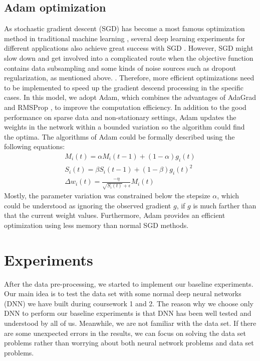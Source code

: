 \documentclass{article}
\begin{document}
\subsection{Adam optimization}
As stochastic gradient descent (SGD) has become a most famous optimization method in traditional machine learning \cite{kingma2014adam}, several deep learning experiments for different applications also achieve great success with SGD \cite{deng2013recent, krizhevsky2012imagenet, hinton2006reducing, hinton2012improving, graves2013speech}. However, SGD might slow down and get involved into a complicated route when the objective function contains data subsampling and some kinds of noise sources such as dropout regularization, as mentioned above. \cite{hinton2006reducing, kingma2014adam}. Therefore, more efficient optimizations need to be implemented to speed up the gradient descend processing in the specific cases. In this model, we adopt Adam, which combines the advantages of AdaGrad \cite {duchi2011adaptive} and RMSProp \cite{tieleman2012lecture}, to improve the computation efficiency. In addition to the good performance on sparse data and non-stationary settings, Adam updates the weights in the network within a bounded variation so the algorithm could find the optima. The algorithms of Adam could be formally described using the following equations:
\begin{eqnarray}
	M_i(t)=\alpha M_i(t-1)+(1-\alpha)g_i(t) \\
    S_i(t)=\beta S_i(t-1)+(1-\beta)g_i(t)^2 \\
    \Delta w_i(t)=\frac{-\eta}{\sqrt{S_i(t)}+\epsilon}M_i(t)
\end{eqnarray}
Mostly, the parameter variation was constrained below the stepsize $\alpha$, which could be understood as ignoring the observed gradient $g$, if $g$ is much farther than that the current weight values. Furthermore, Adam provides an efficient optimization using less memory than normal SGD methods.

\section{Experiments}
After the data pre-processing, we started to implement our baseline experiments. Our main idea is to test the data set with some normal deep neural networks (DNN) we have built during coursework 1 and 2. The reason why we choose only DNN to perform our baseline experiments is  that DNN has been well tested and understood by all of us. Meanwhile, we are not familiar with the data set. If there are some unexpected errors in the results, we can focus on solving the data set problems rather than worrying about both neural network problems and data set problems.
\end{document}
